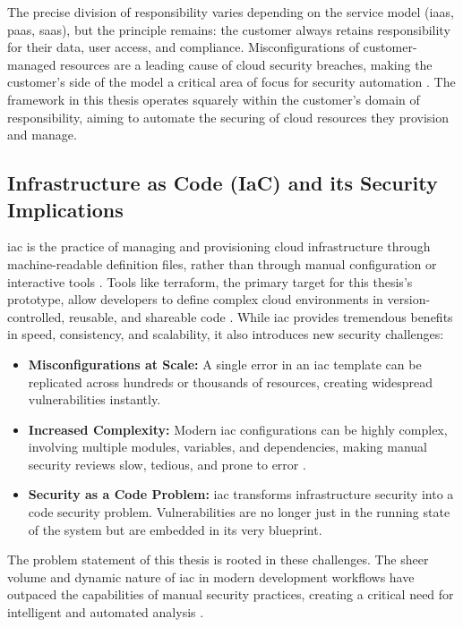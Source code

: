 The precise division of responsibility varies depending on the service model (\gls{iaas}, \gls{paas}, \gls{saas}), but the principle remains: the customer always retains responsibility for their data, user access, and compliance. Misconfigurations of customer-managed resources are a leading cause of cloud security breaches, making the customer's side of the model a critical area of focus for security automation \cite{cloud_security_alliance_mitigating_2023}. The framework in this thesis operates squarely within the customer's domain of responsibility, aiming to automate the securing of cloud resources they provision and manage.

\subsection{Infrastructure as Code (IaC) and its Security Implications}
\gls{iac} is the practice of managing and provisioning cloud infrastructure through machine-readable definition files, rather than through manual configuration or interactive tools \cite{dasari_infrastructure_2025}. Tools like \gls{terraform}, the primary target for this thesis's prototype, allow developers to define complex cloud environments in version-controlled, reusable, and shareable code \cite{howard_terraform_2022-1}. While \gls{iac} provides tremendous benefits in speed, consistency, and scalability, it also introduces new security challenges:
\begin{itemize}
    \item \textbf{Misconfigurations at Scale:} A single error in an \gls{iac} template can be replicated across hundreds or thousands of resources, creating widespread vulnerabilities instantly.
    \item \textbf{Increased Complexity:} Modern \gls{iac} configurations can be highly complex, involving multiple modules, variables, and dependencies, making manual security reviews slow, tedious, and prone to error \cite{tunc_cloud_2017}.
    \item \textbf{Security as a Code Problem:} \gls{iac} transforms infrastructure security into a code security problem. Vulnerabilities are no longer just in the running state of the system but are embedded in its very blueprint.
\end{itemize}
The problem statement of this thesis is rooted in these challenges. The sheer volume and dynamic nature of \gls{iac} in modern development workflows have outpaced the capabilities of manual security practices, creating a critical need for intelligent and automated analysis \cite{fu_ai_2025}.



